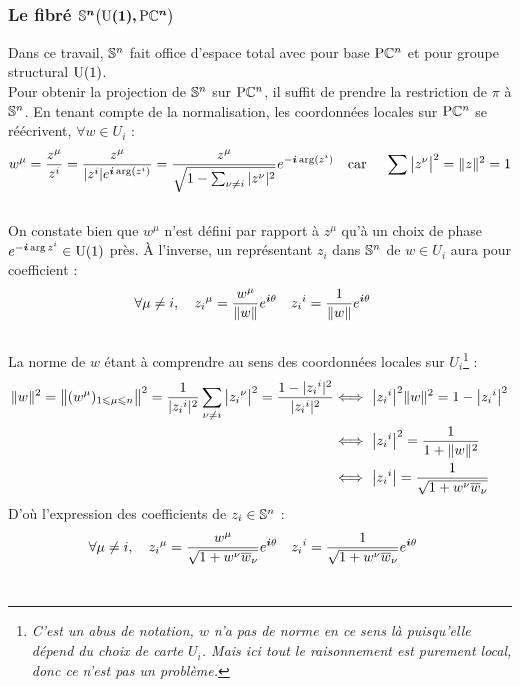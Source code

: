 \subsubsection{Le fibré $\bf{\VFP}$}\label{subsec:SUPC_VFP}

Dans ce travail, $\S{n}$ fait office d'espace total avec pour base $\PC{n}$ et pour groupe structural $\U{1}$.
\\
Pour obtenir la projection de $\S{n}$ sur $\PC{n}$, il suffit de prendre la restriction de $\pi$ à $\S{n}$. En tenant compte de la normalisation, les coordonnées locales sur $\PC{n}$ se réécrivent, $\forall w\in U_i$ :
\begin{align*}
	w^\mu = \frac{z^\mu}{z^i} &= \frac{z^\mu}{|z^i|e^{\i \arg (z^i)}} = \frac{z^{\mu}}{\sqrt{1 - \sum_{\nu \neq i} |z^\nu|^2}} e^{-\i \arg(z^i)}  &  \text{car }\quad \sum \big|z^\nu\big|^2 = \|z\|^2 = 1
\end{align*}
\\
On constate bien que $w^\mu$ n'est défini par rapport à $z^\mu$ qu'à un choix de phase $e^{-\i \arg z^i}\in \U{1}$ près. À l'inverse, un représentant $z_i$ dans $\S{n}$ de $w\in U_i$ aura pour coefficient :
\begin{align*}
	\forall \mu\neq i,\quad {z_i}^\mu &= \frac{w^\mu}{\|w\|}e^{\i \theta}  &  {z_i}^i &= \frac{1}{\|w\|}e^{\i \theta} 
\end{align*}
\\
La norme de $w$ étant à comprendre au sens des coordonnées locales sur $U_i$\footnote{\itshape
	C'est un abus de notation, $w$ n'a pas de norme en ce sens là puisqu'elle dépend du choix de carte $U_i$. Mais ici tout le raisonnement est purement local, donc ce n'est pas un problème.
} :
\begin{align*}
	\|w\|^2 = \big\|(w^\mu)_{1\leq \mu\leq n}\big\|^2 = \frac{1}{|{z_i}^i|^2}\sum_{\nu \neq i} \big|{z_i}^\nu\big|^2 = \frac{1 - |{z_i}^i|^2}{|{z_i}^i|^2} &\Llr\ \big| {z_i}^i \big|^2 \|w\|^2 = 1 - \big|{z_i}^i\big|^2 \\
	&\Llr\ \big|{z_i}^i\big|^2 = \frac{1}{1 + \|w\|^2} \\
	&\Llr\ \big|{z_i}^i\big| = \frac{1}{\sqrt{1 + w^\nu \congu{w}_\nu}}
\end{align*}
D'où l'expression des coefficients de $z_i\in\S{n}$ :
\begin{align*}
	 \forall \mu\neq i,\quad {z_i}^\mu &= \frac{w^\mu}{\sqrt{1 + w^\nu \congu{w}_\nu}}e^{\i \theta}  &  {z_i}^i &= \frac{1}{\sqrt{1 + w^\nu \congu{w}_\nu}}e^{\i \theta} 
\end{align*}
\\

